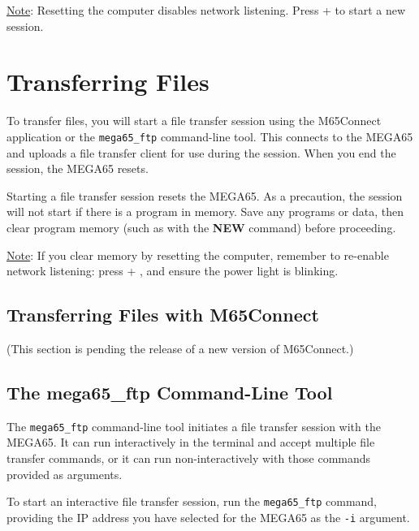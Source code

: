 \underline{Note}: Resetting the computer disables network listening. Press  + \megakey{\pounds} to start a new session.

\section{Transferring Files}

To transfer files, you will start a file transfer session using the M65Connect application or the {\tt mega65\_ftp} command-line tool. This connects to the MEGA65 and uploads a file transfer client for use during the session. When you end the session, the MEGA65 resets.

Starting a file transfer session resets the MEGA65. As a precaution, the session will not start if there is a program in memory. Save any programs or data, then clear program memory (such as with the {\bf NEW} command) before proceeding.

\underline{Note}: If you clear memory by resetting the computer, remember to re-enable network listening: press  + \megakey{\pounds}, and ensure the power light is blinking.

\subsection{Transferring Files with M65Connect}

(This section is pending the release of a new version of M65Connect.)


\subsection{The mega65\_ftp Command-Line Tool}

The {\tt mega65\_ftp} command-line tool initiates a file transfer session with the MEGA65. It can run interactively in the terminal and accept multiple file transfer commands, or it can run non-interactively with those commands provided as arguments.


To start an interactive file transfer session, run the {\tt mega65\_ftp} command, providing the IP address you have selected for the MEGA65 as the {\tt -i} argument.

